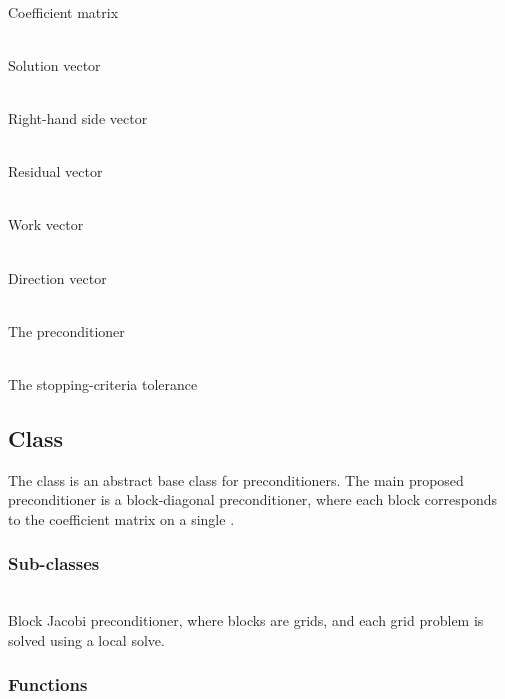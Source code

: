 \documentclass[11pt]{article}
\begin{document}
     \\
    Coefficient matrix

     \\
    Solution vector

     \\
    Right-hand side vector

     \\
    Residual vector

     \\
    Work vector

     \\
    Direction vector

     \\
    The preconditioner

     \\
    The stopping-criteria tolerance
   

\subsection{ Class} \label{s:precon}

   The  class is an abstract base class for preconditioners.
   The main proposed preconditioner is a block-diagonal
   preconditioner, where each block corresponds to the coefficient
   matrix on a single .

\subsubsection{ Sub-classes}

     \\
    Block Jacobi preconditioner, where blocks are grids, and each grid
    problem is solved using a local  solve.

\subsubsection{ Functions}
\end{document}
